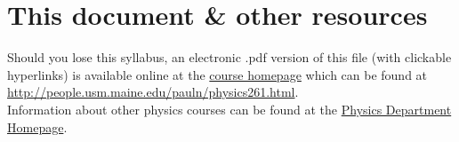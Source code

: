 \documentclass[justified]{tufte-handout}
\begin{document}
\section{This document \& other resources}
 Should you lose this syllabus, an electronic .pdf version of this file (with clickable hyperlinks)  is available online at the \href{portlandphysics.me/physics261}{course homepage}  which can be found at \\ \href{portlandphysics.me/physics261}{http://people.usm.maine.edu/pauln/physics261.html}.\\
 Information about other physics courses can be found at the  \href{http://usm.maine.edu/phy}{Physics Department Homepage}. 
 
\end{document}
